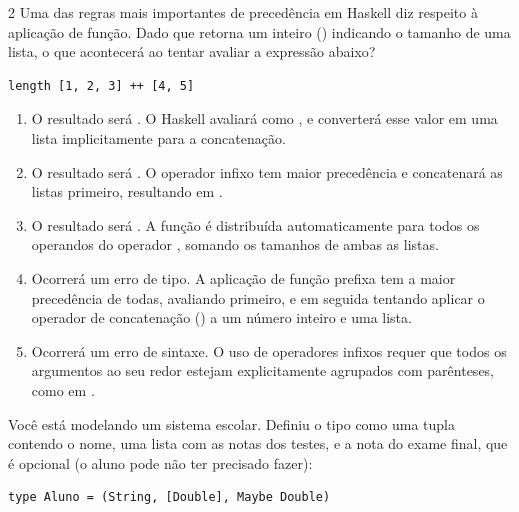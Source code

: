 \documentclass[a4paper,10pt,brazil]{article}
\begin{document}
\begin{multicols}{2}
Uma das regras mais importantes de precedência em Haskell diz respeito à aplicação de função. Dado que  retorna um inteiro () indicando o tamanho de uma lista, o que acontecerá ao tentar avaliar a expressão abaixo?
\begin{verbatim}
length [1, 2, 3] ++ [4, 5]
\end{verbatim}

\begin{enumerate}
  \item O resultado será \haskellinline{[3, 4, 5]}. O Haskell avaliará  como , e converterá esse valor em uma lista implicitamente para a concatenação.

  \item O resultado será . O operador infixo \haskellinline{++} tem maior precedência e concatenará as listas primeiro, resultando em .

  \item O resultado será . A função  é distribuída automaticamente para todos os operandos do operador \haskellinline{++}, somando os tamanhos de ambas as listas.

  \item Ocorrerá um erro de tipo. A aplicação de função prefixa tem a maior precedência de todas, avaliando  primeiro, e em seguida tentando aplicar o operador de concatenação (\haskellinline{++}) a um número inteiro e uma lista.

  \item Ocorrerá um erro de sintaxe. O uso de operadores infixos requer que todos os argumentos ao seu redor estejam explicitamente agrupados com parênteses, como em .


\end{enumerate}

Você está modelando um sistema escolar. Definiu o tipo  como uma tupla contendo o nome, uma lista com as notas dos testes, e a nota do exame final, que é opcional (o aluno pode não ter precisado fazer):
\begin{verbatim}
type Aluno = (String, [Double], Maybe Double)
\end{verbatim}


\end{multicols}
\end{document}
